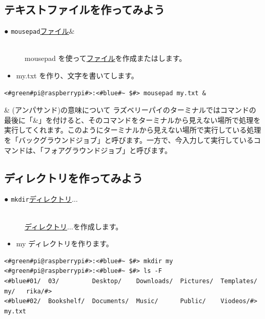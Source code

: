 \subsection{テキストファイルを作ってみよう}
\begin{description}
\item[● \texttt{mousepad}\textvisiblespace \underline{ファイル}\textvisiblespace \&]\mbox{}\\
mousepad を使って\underline{ファイル}を作成またはします。
\end{description}
\newpage
\begin{itemize}
\item[<例>]my.txt を作り、文字を書いてします。
\end{itemize}
\begin{lstlisting}[caption=mousepadの例, label=mousepad]
<#green#pi@raspberrypi#>:<#blue#~ $#> mousepad my.txt &
\end{lstlisting}

\begin{itembox}[c]{\& (アンパサンド)の意味について}
    ラズベリーパイのターミナルではコマンドの最後に「\&」を付けると、そのコマンドをターミナルから見えない場所で処理を実行してくれます。このようにターミナルから見えない場所で実行している処理を「バックグラウンドジョブ」と呼びます。一方で、今入力して実行しているコマンドは、「フォアグラウンドジョブ」と呼びます。
\end{itembox}

\subsection{ディレクトリを作ってみよう}
\begin{description}
\item[● \texttt{mkdir}\textvisiblespace \underline{ディレクトリ}$\ldots$]\mbox{}\\
\underline{ディレクトリ}$\ldots$を作成します。
\end{description}
\begin{itemize}
\item[<例>]my ディレクトリを作ります。
\end{itemize}
\begin{lstlisting}[caption=mkdirの例, label=mkdir]
<#green#pi@raspberrypi#>:<#blue#~ $#> mkdir my
<#green#pi@raspberrypi#>:<#blue#~ $#> ls -F
<#blue#01/  03/         Desktop/    Downloads/  Pictures/  Templates/   my/   rika/#>
<#blue#02/  Bookshelf/  Documents/  Music/      Public/    Viodeos/#>     my.txt
\end{lstlisting}

